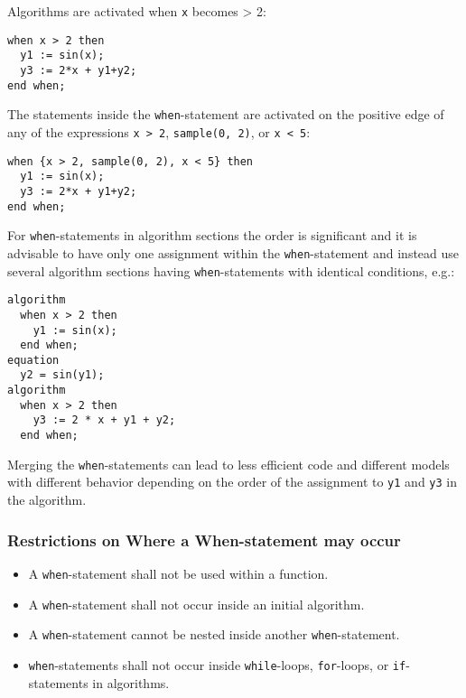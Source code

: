 \begin{example}
Algorithms are activated when \lstinline!x! becomes \textgreater{} 2:
\begin{lstlisting}[language=modelica]
when x > 2 then
  y1 := sin(x);
  y3 := 2*x + y1+y2;
end when;
\end{lstlisting}
The statements inside the \lstinline!when!-statement are activated on the positive edge of any of the expressions \lstinline!x > 2!, \lstinline!sample(0, 2)!, or \lstinline!x < 5!:
\begin{lstlisting}[language=modelica]
when {x > 2, sample(0, 2), x < 5} then
  y1 := sin(x);
  y3 := 2*x + y1+y2;
end when;
\end{lstlisting}
For \lstinline!when!-statements in algorithm sections the order is significant and it is advisable to have only one assignment within the \lstinline!when!-statement and instead use several algorithm sections having \lstinline!when!-statements with identical conditions, e.g.:
\begin{lstlisting}[language=modelica]
algorithm
  when x > 2 then
    y1 := sin(x);
  end when;
equation
  y2 = sin(y1);
algorithm
  when x > 2 then
    y3 := 2 * x + y1 + y2;
  end when;
\end{lstlisting}
Merging the \lstinline!when!-statements can lead to less efficient code and different models with different behavior depending on the order of the assignment to \lstinline!y1! and \lstinline!y3! in the algorithm.
\end{example}

\subsubsection{Restrictions on Where a When-statement may occur}\label{restrictions-on-where-a-when-statement-may-occur}

\begin{itemize}
\item
  A \lstinline!when!-statement shall not be used within a function.
\item
  A \lstinline!when!-statement shall not occur inside an initial algorithm.
\item
  A \lstinline!when!-statement cannot be nested inside another \lstinline!when!-statement.
\item
  \lstinline!when!-statements shall not occur inside \lstinline!while!-loops, \lstinline!for!-loops, or \lstinline!if!-statements in algorithms.
\end{itemize}

